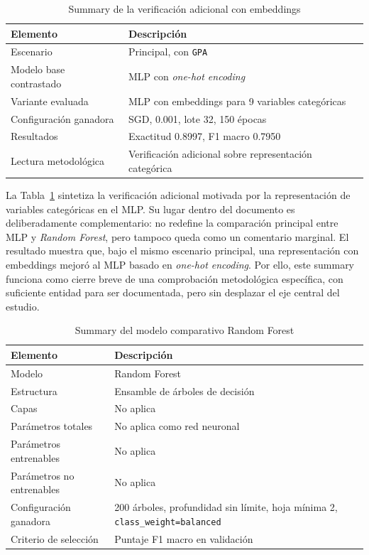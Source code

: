 \documentclass[conference]{IEEEtran}
\begin{document}
\begin{table}[htbp]
\centering
\caption{Summary de la verificación adicional con embeddings}
\scriptsize
\setlength{\tabcolsep}{4pt}
\begin{tabular}{p{3.0cm}p{4.2cm}}
\toprule
Elemento & Descripción \\
\midrule
Escenario & Principal, con \texttt{GPA} \\
Modelo base contrastado & MLP con \textit{one-hot encoding} \\
Variante evaluada & MLP con embeddings para 9 variables categóricas \\
Configuración ganadora & SGD, 0.001, lote 32, 150 épocas \\
Resultados & Exactitud 0.8997, F1 macro 0.7950 \\
Lectura metodológica & Verificación adicional sobre representación categórica \\
\bottomrule
\end{tabular}
\normalsize
\label{tab:summary_embeddings}
\end{table}

La Tabla~\ref{tab:summary_embeddings} sintetiza la verificación adicional motivada por la representación de variables categóricas en el MLP. Su lugar dentro del documento es deliberadamente complementario: no redefine la comparación principal entre MLP y \textit{Random Forest}, pero tampoco queda como un comentario marginal. El resultado muestra que, bajo el mismo escenario principal, una representación con embeddings mejoró al MLP basado en \textit{one-hot encoding}. Por ello, este summary funciona como cierre breve de una comprobación metodológica específica, con suficiente entidad para ser documentada, pero sin desplazar el eje central del estudio.

\begin{table}[htbp]
\centering
\caption{Summary del modelo comparativo Random Forest}
\scriptsize
\setlength{\tabcolsep}{4pt}
\begin{tabular}{p{3.0cm}p{4.2cm}}
\toprule
Elemento & Descripción \\
\midrule
Modelo & Random Forest \\
Estructura & Ensamble de árboles de decisión \\
Capas & No aplica \\
Parámetros totales & No aplica como red neuronal \\
Parámetros entrenables & No aplica \\
Parámetros no entrenables & No aplica \\
Configuración ganadora & 200 árboles, profundidad sin límite, hoja mínima 2, \texttt{class\_weight=balanced} \\
Criterio de selección & Puntaje F1 macro en validación \\
\bottomrule
\end{tabular}
\normalsize
\label{tab:summary_rf}
\end{table}
\end{document}
